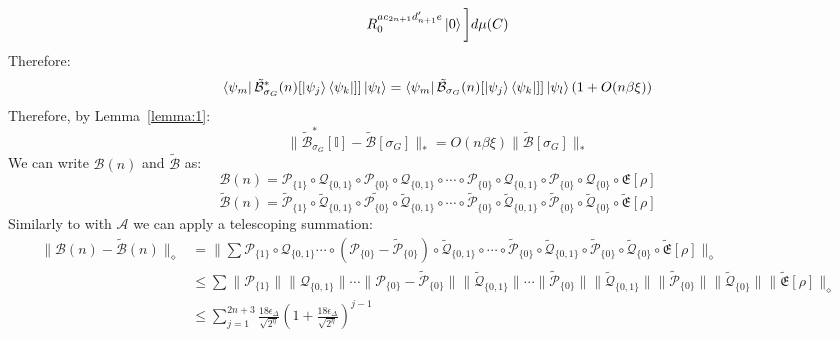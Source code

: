 \documentclass[aps,floatfix,10pt,amssymb,amsfont,amsmath,superscriptaddress,float,nofootinbib,longbibliography,nobalancelastpage,twocolumn]{revtex4-2}
\begin{document}
\begin{widetext}
\begin{multline}
    R_0^{ac_{2n+1}d'_{n+1}e}
    \ket{0}
    \bigg]d\mu(C)
\end{multline}
Therefore:
\begin{equation}
    \bra{\psi_m}\tilde{\mathcal{B}}^*_{\sigma_G}(n)[\ket{\psi_j}\bra{\psi_k}]]\ket{\psi_l} = \bra{\psi_m}\tilde{\mathcal{B}}_{\sigma_G}(n)[\ket{\psi_j}\bra{\psi_k}]]\ket{\psi_l}(1+O(n\beta\xi))
\end{equation}
Therefore, by Lemma~\ref{lemma:1}:
\begin{equation}
    \|\tilde{\mathcal{B}}^*_{\sigma_G}[\mathbb{I}] - \tilde{\mathcal{B}}[\sigma_G]\|_* = O(n\beta \xi)\|\tilde{\mathcal{B}}[\sigma_G]\|_*
    \label{eq:Boutput}
\end{equation}
We can write $\mathcal{B}(n)$ and $\tilde{\mathcal{B}}$ as:
\begin{equation}
    \mathcal{B}(n) = \mathcal{P}_{\{1\}}\circ\mathcal{Q}_{\{0,1\}}\circ\mathcal{P}_{\{0\}}\circ\mathcal{Q}_{\{0,1\}}\circ\cdots\circ\mathcal{P}_{\{0\}}\circ\mathcal{Q}_{\{0,1\}}\circ\mathcal{P}_{\{0\}}\circ\mathcal{Q}_{\{0\}}\circ\mathfrak{E}[\rho]
\end{equation}
\begin{equation}
    \tilde{\mathcal{B}}(n) = \tilde{\mathcal{P}}_{\{1\}}\circ\tilde {\mathcal{Q}}_{\{0,1\}}\circ\tilde{\mathcal{P}_{\{0\}}}\circ\tilde{\mathcal{Q}}_{\{0,1\}}\circ\cdots\circ\tilde{\mathcal{P}}_{\{0\}}\circ\tilde{\mathcal{Q}}_{\{0,1\}}\circ\tilde{\mathcal{P}}_{\{0\}}\circ\tilde{\mathcal{Q}}_{\{0\}}\circ\tilde{\mathfrak{E}}[\rho]
\end{equation}
Similarly to with $\mathcal{A}$ we can apply a telescoping summation:
\begin{align}
    \|\mathcal{B}(n)-\tilde{\mathcal{B}}(n)\|_{\diamond} &= \|\sum\mathcal{P}_{\{1\}}\circ\mathcal{Q}_{\{0,1\}}\cdots\circ(\mathcal{P}_{\{0\}}-\tilde{\mathcal{P}}_{\{0\}})\circ\tilde{\mathcal{Q}}_{\{0,1\}}\circ\cdots\circ\tilde{\mathcal{P}}_{\{0\}}\circ\tilde{\mathcal{Q}}_{\{0,1\}}\circ\tilde{\mathcal{P}}_{\{0\}}\circ\tilde{\mathcal{Q}}_{\{0\}}\circ\tilde{\mathfrak{E}}[\rho]\|_{\diamond}\\
    &\leq \sum\|\mathcal{P}_{\{1\}}\|\|\mathcal{Q}_{\{0,1\}}\|\cdots\|\mathcal{P}_{\{0\}}-\tilde{\mathcal{P}}_{\{0\}}\|\|\tilde{\mathcal{Q}}_{\{0,1\}}\|\cdots\|\tilde{\mathcal{P}}_{\{0\}}\|\|\tilde{\mathcal{Q}}_{\{0,1\}}\|\|\tilde{\mathcal{P}}_{\{0\}}\|\|\tilde{\mathcal{Q}}_{\{0\}}\|\|\tilde{\mathfrak{E}}[\rho]\|_{\diamond}\\
    &\leq  \sum_{j=1}^{2n+3}\frac{18\epsilon_{\Delta}}{\sqrt{2^{\eta}}}(1+\frac{18\epsilon_{\Delta}}{\sqrt{2^{\eta}}})^{j-1}\\

\end{align}
\end{widetext}
\end{document}
